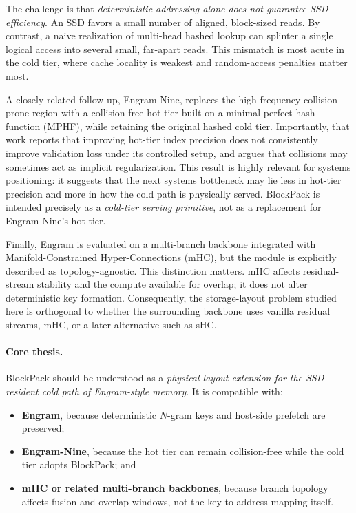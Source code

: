 \documentclass[11pt]{article}
\begin{document}
The challenge is that \emph{deterministic addressing alone does not guarantee SSD efficiency}. An SSD favors a small number of aligned, block-sized reads. By contrast, a naive realization of multi-head hashed lookup can splinter a single logical access into several small, far-apart reads. This mismatch is most acute in the cold tier, where cache locality is weakest and random-access penalties matter most.

A closely related follow-up, Engram-Nine, replaces the high-frequency collision-prone region with a collision-free hot tier built on a minimal perfect hash function (MPHF), while retaining the original hashed cold tier. Importantly, that work reports that improving hot-tier index precision does not consistently improve validation loss under its controlled setup, and argues that collisions may sometimes act as implicit regularization. This result is highly relevant for systems positioning: it suggests that the next systems bottleneck may lie less in hot-tier precision and more in how the cold path is physically served. BlockPack is intended precisely as a \emph{cold-tier serving primitive}, not as a replacement for Engram-Nine's hot tier.

Finally, Engram is evaluated on a multi-branch backbone integrated with Manifold-Constrained Hyper-Connections (mHC), but the module is explicitly described as topology-agnostic. This distinction matters. mHC affects residual-stream stability and the compute available for overlap; it does not alter deterministic key formation. Consequently, the storage-layout problem studied here is orthogonal to whether the surrounding backbone uses vanilla residual streams, mHC, or a later alternative such as sHC.

\paragraph{Core thesis.}
BlockPack should be understood as a \emph{physical-layout extension for the SSD-resident cold path of Engram-style memory}. It is compatible with:
\begin{itemize}[leftmargin=1.5em]
    \item \textbf{Engram}, because deterministic $N$-gram keys and host-side prefetch are preserved;
    \item \textbf{Engram-Nine}, because the hot tier can remain collision-free while the cold tier adopts BlockPack; and
    \item \textbf{mHC or related multi-branch backbones}, because branch topology affects fusion and overlap windows, not the key-to-address mapping itself.
\end{itemize}
\end{document}
